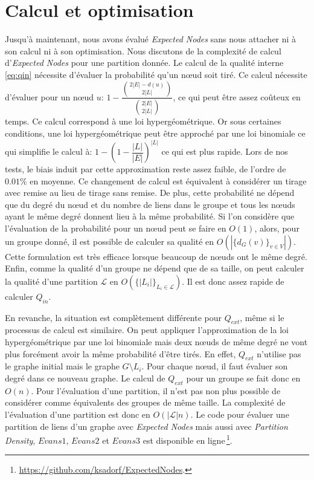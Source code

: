 \section{Calcul et optimisation}
Jusqu'à maintenant, nous avons évalué \emph{Expected Nodes} sans nous attacher ni à son calcul ni à son optimisation.
Nous discutons de la complexité de calcul d'\emph{Expected Nodes} pour une partition donnée.
Le calcul de la qualité interne \ref{eq:qin} nécessite d'évaluer la probabilité qu'un n\oe{}ud soit tiré.
Ce calcul nécessite d'évaluer pour un n\oe{}ud $u$: $1 - \dfrac{ \binom{2|E|-d(u)}{2|L|} }{ \binom{2|E|}{2|L|} }$, ce qui peut être assez coûteux en temps.
Ce calcul correspond à une loi hypergéométrique.
Or sous certaines conditions, une loi hypergéométrique peut être approché par une loi binomiale ce qui simplifie le calcul à: $1 - (1- \dfrac{|L|}{|E|})^{|L|}$ ce qui est plus rapide.
Lors de nos tests, le biais induit par cette approximation reste assez faible, de l'ordre de $0.01\%$ en moyenne.
Ce changement de calcul est équivalent à considérer un tirage avec remise au lieu de tirage sans remise.
De plus, cette probabilité ne dépend que du degré du n\oe{}ud et du nombre de liens dans le groupe et tous les n\oe{}uds ayant le même degré donnent lieu à la même probabilité.
Si l'on considère que l'évaluation de la probabilité pour un n\oe{}ud peut se faire en $O(1)$, alors, pour un groupe donné, il est possible de calculer sa qualité en $O(|\{d_G(v)\}_{v \in V}|)$.
Cette formulation est très efficace lorsque beaucoup de n\oe{}uds ont le même degré.
Enfin, comme la qualité d'un groupe ne dépend que de sa taille, on peut calculer la qualité d'une partition $\mathcal{L}$ en $O(\{|L_i|\}_{L_i \in \mathcal{L}})$.
Il est donc assez rapide de calculer $Q_{in}$.



En revanche, la situation est complètement différente pour $Q_{ext}$, même si le processus de calcul est similaire.
On peut appliquer l'approximation de la loi hypergéométrique par une loi binomiale mais deux n\oe{}uds de même degré ne vont plus forcément avoir la même probabilité d'être tirés.
En effet, $Q_{ext}$ n'utilise pas le graphe initial mais le graphe $G\setminus L_i$.
Pour chaque n\oe{}ud, il faut évaluer son degré dans ce nouveau graphe.
Le calcul de $Q_{ext}$ pour un groupe se fait donc en $O(n)$.
Pour l'évaluation d'une partition, il n'est pas non plus possible de considérer comme équivalents des groupes de même taille.
La complexité de l'évaluation d'une partition est donc en $O(|\mathcal{L}|n)$.
Le code pour évaluer une partition de liens d'un graphe avec \emph{Expected Nodes} mais aussi avec \emph{Partition Density}, $Evans1$, $Evans2$ et $Evans3$ est disponible en ligne\,\footnote{ \url{https://github.com/ksadorf/ExpectedNodes}.}.


